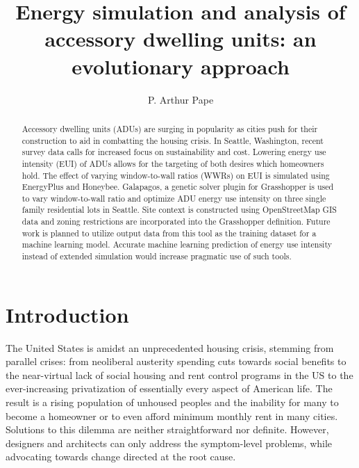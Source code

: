 \documentclass[sagev,times,Review,doublespace]{sagej}
\begin{document}

\title{Energy simulation and analysis of accessory dwelling units: 
an evolutionary approach}

\author{P. Arthur Pape}




\begin{abstract}
Accessory dwelling units (ADUs) are surging in popularity as cities push for their construction to aid in combatting the housing crisis. In Seattle, Washington, recent survey data calls for increased focus on sustainability and cost. Lowering energy use intensity (EUI) of ADUs allows for the targeting of both desires which homeowners hold. The effect of varying window-to-wall ratios (WWRs) on EUI is simulated using EnergyPlus and Honeybee. Galapagos, a genetic solver plugin for Grasshopper is used to vary window-to-wall ratio and optimize ADU energy use intensity on three single family residential lots in Seattle. Site context is constructed using OpenStreetMap GIS data and zoning restrictions are incorporated into the Grasshopper definition. Future work is planned to utilize output data from this tool as the training dataset for a machine learning model. Accurate machine learning prediction of energy use intensity instead of extended simulation would increase pragmatic use of such tools.
\end{abstract}


\maketitle

\section{Introduction}
The United States is amidst an unprecedented housing crisis, stemming from parallel crises: from neoliberal austerity spending cuts towards social benefits to the near-virtual lack of social housing and rent control programs in the US to the ever-increasing privatization of essentially every aspect of American life\cite{10.2307/26297969}. The result is a rising population of unhoused peoples and the inability for many to become a homeowner or to even afford minimum monthly rent in many cities. Solutions to this dilemma are neither straightforward nor definite. However, designers and architects can only address the symptom-level problems, while advocating towards change directed at the root cause.
\end{document}

